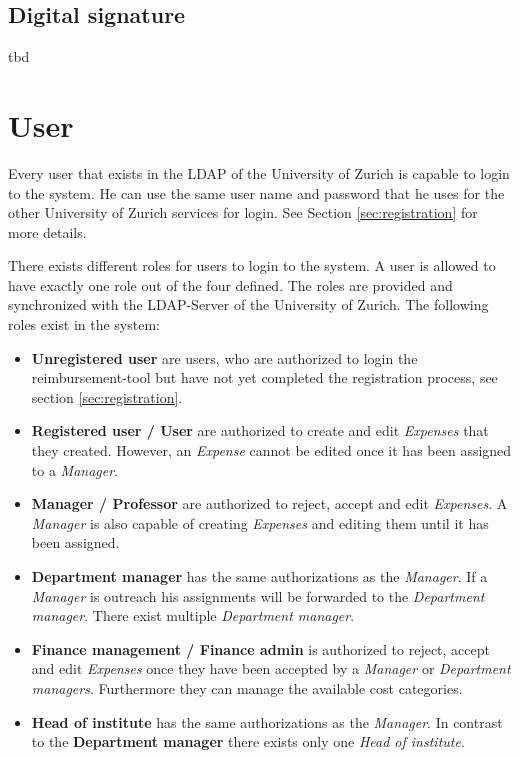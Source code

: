 \subsection{Digital signature}
tbd

\section{User}

Every user that exists in the LDAP of the University of Zurich is capable to login to the system. He can use the same user name and password that he uses for the other University of Zurich services for login. See Section \ref{sec:registration} for more details.

There exists different roles for users to login to the system. A user is allowed to have exactly one role out of the four defined. The roles are provided and synchronized with the LDAP-Server of the University of Zurich. The following roles exist in the system:

\begin{itemize}
    \item \textbf{Unregistered user} are users, who are authorized to login the reimbursement-tool but have not yet completed the registration process, see section \ref{sec:registration}.
    \item \textbf{Registered user / User} are authorized to create and edit \textit{Expenses} that they created. However, an \textit{Expense} cannot be edited once it has been assigned to a \textit{Manager}.
    
    \item \textbf{Manager / Professor} are authorized to reject, accept and edit \textit{Expenses}. A \textit{Manager} is also capable of creating \textit{Expenses} and editing them until it has been assigned. 
    
    \item \textbf{Department manager} has the same authorizations as the \textit{Manager}. If a \textit{Manager} is outreach his assignments will be forwarded to the \textit{Department manager}. There exist multiple \textit{Department manager}.
    
    \item \textbf{Finance management / Finance admin} is authorized to reject, accept and edit \textit{Expenses} once they have been accepted by a \textit{Manager} or \textit{Department managers}. Furthermore they can manage the available cost categories.
    
    \item \textbf{Head of institute} has the same authorizations as the \textit{Manager}. In contrast to the \textbf{Department manager} there exists only one \textit{Head of institute}.
\end{itemize}

